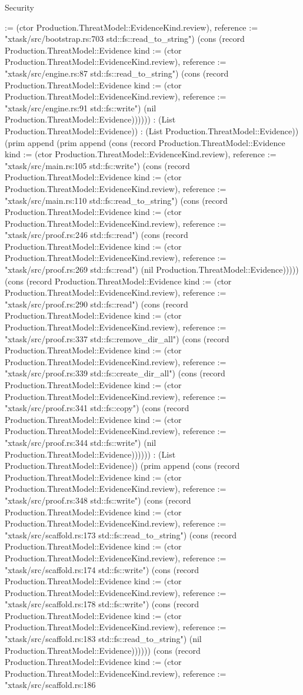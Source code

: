 \begin{lexlean}{Security}
\begin{semanticmodule}
{:= (ctor Production.ThreatModel::EvidenceKind.review), reference := "xtask/src/bootstrap.rs:703 std::fs::read_to_string"}) (cons (record Production.ThreatModel::Evidence {kind := (ctor Production.ThreatModel::EvidenceKind.review), reference := "xtask/src/engine.rs:87 std::fs::read_to_string"}) (cons (record Production.ThreatModel::Evidence {kind := (ctor Production.ThreatModel::EvidenceKind.review), reference := "xtask/src/engine.rs:91 std::fs::write"}) (nil Production.ThreatModel::Evidence)))))) : (List Production.ThreatModel::Evidence)) : (List Production.ThreatModel::Evidence)) (prim append (prim append (cons (record Production.ThreatModel::Evidence {kind := (ctor Production.ThreatModel::EvidenceKind.review), reference := "xtask/src/main.rs:105 std::fs::write"}) (cons (record Production.ThreatModel::Evidence {kind := (ctor Production.ThreatModel::EvidenceKind.review), reference := "xtask/src/main.rs:110 std::fs::read_to_string"}) (cons (record Production.ThreatModel::Evidence {kind := (ctor Production.ThreatModel::EvidenceKind.review), reference := "xtask/src/proof.rs:246 std::fs::read"}) (cons (record Production.ThreatModel::Evidence {kind := (ctor Production.ThreatModel::EvidenceKind.review), reference := "xtask/src/proof.rs:269 std::fs::read"}) (nil Production.ThreatModel::Evidence))))) (cons (record Production.ThreatModel::Evidence {kind := (ctor Production.ThreatModel::EvidenceKind.review), reference := "xtask/src/proof.rs:290 std::fs::read"}) (cons (record Production.ThreatModel::Evidence {kind := (ctor Production.ThreatModel::EvidenceKind.review), reference := "xtask/src/proof.rs:337 std::fs::remove_dir_all"}) (cons (record Production.ThreatModel::Evidence {kind := (ctor Production.ThreatModel::EvidenceKind.review), reference := "xtask/src/proof.rs:339 std::fs::create_dir_all"}) (cons (record Production.ThreatModel::Evidence {kind := (ctor Production.ThreatModel::EvidenceKind.review), reference := "xtask/src/proof.rs:341 std::fs::copy"}) (cons (record Production.ThreatModel::Evidence {kind := (ctor Production.ThreatModel::EvidenceKind.review), reference := "xtask/src/proof.rs:344 std::fs::write"}) (nil Production.ThreatModel::Evidence)))))) : (List Production.ThreatModel::Evidence)) (prim append (cons (record Production.ThreatModel::Evidence {kind := (ctor Production.ThreatModel::EvidenceKind.review), reference := "xtask/src/proof.rs:348 std::fs::write"}) (cons (record Production.ThreatModel::Evidence {kind := (ctor Production.ThreatModel::EvidenceKind.review), reference := "xtask/src/scaffold.rs:173 std::fs::read_to_string"}) (cons (record Production.ThreatModel::Evidence {kind := (ctor Production.ThreatModel::EvidenceKind.review), reference := "xtask/src/scaffold.rs:174 std::fs::write"}) (cons (record Production.ThreatModel::Evidence {kind := (ctor Production.ThreatModel::EvidenceKind.review), reference := "xtask/src/scaffold.rs:178 std::fs::write"}) (cons (record Production.ThreatModel::Evidence {kind := (ctor Production.ThreatModel::EvidenceKind.review), reference := "xtask/src/scaffold.rs:183 std::fs::read_to_string"}) (nil Production.ThreatModel::Evidence)))))) (cons (record Production.ThreatModel::Evidence {kind := (ctor Production.ThreatModel::EvidenceKind.review), reference := "xtask/src/scaffold.rs:186 }
\end{semanticmodule}
\end{lexlean}
